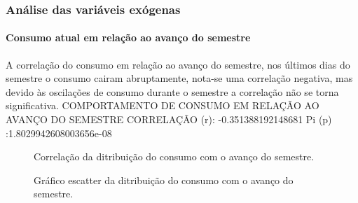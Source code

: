 \documentclass[	12pt, Times, openright, twoside, a4paper, english, brazil]{abntex2}
\begin{document}
    	    \subsubsection{Análise das variáveis exógenas}
    	        \paragraph{Consumo atual em relação ao avanço do semestre}
    	            A correlação do consumo em relação ao avanço do semestre, nos últimos dias do semestre o consumo cairam abruptamente, nota-se uma correlação negativa, mas devido às oscilações de consumo durante o semestre  a correlação não se torna significativa.\newline
    	            COMPORTAMENTO DE CONSUMO EM RELAÇÃO AO AVANÇO DO SEMESTRE\newline 
                    CORRELAÇÃO (r): -0.351388192148681\newline
                    Pi (p) :1.8029942608003656e-08\newline
                    \begin{figure}[!ht]
                    	\caption{Correlação da ditribuição do consumo com o avanço do semestre. \label{fig:case1_perc_sem} }
                    \end{figure}
                
                \begin{figure}[!ht]
                	\caption{Gráfico escatter da ditribuição do consumo com o avanço do semestre. \label{fig:case1_perc_sem_scatter} }
                \end{figure}
\end{document}
